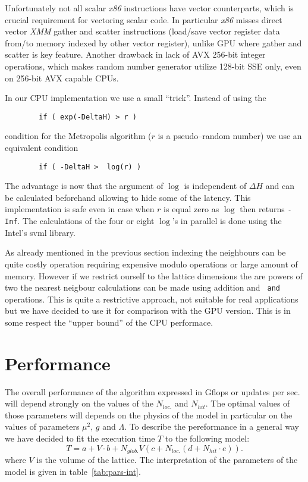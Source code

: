 \documentclass[a4paper]{llncs}
\begin{document}
Unfortunately not all scalar \emph{x86} instructions have vector counterparts,
which is crucial requirement for vectoring scalar code. In particular
\emph{x86} misses direct vector \emph{XMM} gather and scatter instructions
(load/save vector register data from/to memory indexed by other vector
register), unlike GPU where gather and scatter is key feature. Another drawback
in lack of AVX 256-bit integer operations, which makes random number generator
utilize 128-bit SSE only, even on 256-bit AVX capable CPUs.

In our CPU implementation we use a small ``trick''. Instead of using the
\begin{lstlisting}
        if ( exp(-DeltaH) > r )
\end{lstlisting}
condition for the Metropolis algorithm ($r$ is a pseudo--random number) we use
an equivalent condition
\begin{lstlisting}
        if ( -DeltaH >  log(r) )
\end{lstlisting}

The advantage is now that the argument of $\log$ is independent of
$\Delta H$ and can be calculated beforehand allowing to hide some of
the latency. This implementation is safe even in case when $r$ is
equal zero as $\log$ then returns {\tt -Inf}.  The calculations of the
four or eight $\log$'s in parallel is done using the Intel's svml
library.

As already mentioned in the previous section indexing the neighbours
can be quite costly operation requiring expensive modulo
operations or large amount of memory. However if
we restrict ourself to the lattice dimensions the are powers of two
the nearest neigbour calculations can be made using addition and {\tt
  and} operations. This is quite a restrictive approach, not suitable
for real applications but we have decided to use it for comparison
with the GPU version. This is in some respect the ``upper bound'' of
the CPU performace.


\section{Performance}
\label{sec:performance}


The overall performance of the algorithm expressed in Gflops or
updates per sec. will depend strongly on the values of the $N_{loc.}$
and $N_{hit}$. The optimal values of those parameters will depends on
the physics of the model in particular on the values of parameters
$\mu^2$, $g$ and $\Lambda$. To describe the pereformance in a general
way we have decided to fit the execution time $T$ to the following
model:
\begin{equation}\label{eq:model}
T  = a+ V \cdot b +
N_{glob.} V \left(c + N_{loc.}\left(d + N_{hit}\cdot e\right)\right) . 
\end{equation}
where $V$ is the volume of the lattice.  The interpretation of the
parameters of the model is given in table~\ref{tab:pars-int}.
\end{document}
